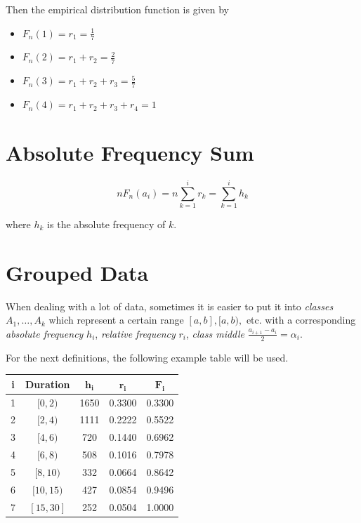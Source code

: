 Then the empirical distribution function is given by

\begin{itemize}

    \item \(F_n(1) = r_1 = \frac{1}{7}\)

    \item \(F_n(2) = r_1 + r_2 = \frac{2}{7}\)

    \item \(F_n(3) = r_1 + r_2 + r_3 = \frac{5}{7}\)

    \item \(F_n(4) = r_1 + r_2 + r_3 + r_4 = 1\)

\end{itemize}

\section{Absolute Frequency Sum}

\[
    n F_n (a_i) = n \sum_{k = 1}^{i} r_k = \sum_{k = 1}^{i} h_k
\]

where \(h_k\) is the absolute frequency of \(k\).

\section{Grouped Data}

When dealing with a lot of data, sometimes it is easier to put it into \emph{classes} \(A_1, \dots, A_k\) which represent a certain range \([a,b], [a,b),\) etc. 
with a corresponding \emph{absolute frequency} \(h_i\), \emph{relative frequency} \(r_i\), \emph{class middle} \( \frac{a_{i + 1} - a_{i}}{2} = \alpha_i\).

For the next definitions, the following example table will be used.

\begin{table}[h!]
\centering
\begin{tabular}{c|c|c|c|c}
    \textbf{i} & \textbf{Duration} & \(\mathbf{h_i}\) & \(\mathbf{r_i}\) & \(\mathbf{F_i}\) \\ \hline
    1 & \([0, 2)\)   & 1650 & 0.3300 & 0.3300 \\
    2 & \([2, 4)\)   & 1111 & 0.2222 & 0.5522 \\
    3 & \([4, 6)\)   & 720  & 0.1440 & 0.6962 \\
    4 & \([6, 8)\)   & 508  & 0.1016 & 0.7978 \\
    5 & \([8, 10)\)  & 332  & 0.0664 & 0.8642 \\
    6 & \([10, 15)\) & 427  & 0.0854 & 0.9496 \\
    7 & \([15, 30]\) & 252  & 0.0504 & 1.0000 \\
\end{tabular}
\end{table}

